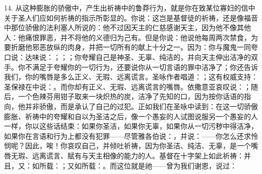 14. 从这种膨胀的骄傲中，产生出祈祷中的鲁莽行为，就是你在致某位寡妇的信中关于圣人们应如何祈祷的指示所彰显的。你说：这岂是基督徒的祈祷，还是像福音中那位骄傲的法利塞人所说的：他不过因天主的仁慈感谢天主，因为他不像其他人：他痛恨罪恶，并不将他的义德归为己有。但是你说：他说他每周两次禁食，为要折磨他邪恶放纵的肉身，并把一切所有的献上十分之一。因为：你与魔鬼一同夸口说：达味说：；；；你夸耀自己是神圣、无辜、纯洁的，并向天主伸出洁净的双手。你不满足于夸耀你的一切行为，还要说你从一切言语的罪中洁净了；你还告诉我们，你的嘴唇是多么正义、无瑕、远离谎言。圣咏作者唱道：；这有权威支持：圣保禄在中说：。而你却有正义、无瑕、远离谎言的嘴唇。依撒意亚哀叹说：；随后，一个色辣芬用钳子取来一块炽热的炭，洁净了先知的口，因为按你话语的指向，他并非骄傲，而是承认了自己的过犯。正如我们在圣咏中读到：在这一切骄傲膨胀、祈祷中的夸耀和自以为圣洁之后，像一个愚妄的人试图说服另一个愚妄的人一样，你以这些话结束：如果你圣洁，如果你无辜，如果你从一切污秽中得洁净，如果你在言语和行为上都没有犯罪——尽管雅各伯说：，并说：——你怎么还求怜悯呢？因此，唉！你哀叹自己，并倾吐祈祷，因为你圣洁、纯洁、无辜，是一个嘴唇无瑕、远离谎言、赋有与天主相像的能力的人。基督在十字架上如此祈祷：并且，又：如所载：；又如所载：。而这位就是祂——曾为我们谢恩，说过：\par


